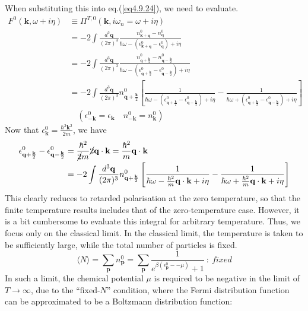  When substituting this into eq.(\ref{eq4.9.24}), we need to evaluate.
\[
\begin{aligned}
F^0(\mathbf k,\omega+i\eta)&\equiv\Pi^{T,0}(\mathbf k,i\omega_n=\omega+i\eta)\\
&=-2\int \frac{d^3\mathbf q}{(2\pi)^3} \frac{n^0_{\mathbf k+\mathbf q}-n^0_{\mathbf q}}{\hbar\omega-(\epsilon^0_{\mathbf k+\mathbf q}-\epsilon^0_{\mathbf q})+i\eta}\\
&=-2\int \frac{d^3\mathbf q}{(2\pi)^3} \frac{n^0_{\mathbf q+\frac{\mathbf k}{2}}-n^0_{\mathbf q-\frac{\mathbf k}{2}}}{\hbar\omega-(\epsilon^0_{\mathbf q+\frac{\mathbf k}{2}}-\epsilon^0_{\mathbf q-\frac{\mathbf k}{2}})+i\eta}\\
&=-2\int \frac{d^3\mathbf q}{(2\pi)^3} n^0_{\mathbf q+\frac{\mathbf k}{2}} \left[ \frac{1}{\hbar \omega-(\epsilon^0_{\mathbf q+\frac{\mathbf k}{2}}-\epsilon^0_{\mathbf q-\frac{\mathbf k}{2}})+i\eta}-\frac{1}{\hbar \omega+(\epsilon^0_{\mathbf q+\frac{\mathbf k}{2}}-\epsilon^0_{\mathbf q-\frac{\mathbf k}{2}})+i\eta} \right]\\
&\quad(\epsilon^0_{-\mathbf k}=\epsilon_{\mathbf k}\quad n^0_{-\mathbf k} =n^0_{\mathbf k}) 
\end{aligned}
\]
Now that $\epsilon_{\mathbf k}^0=\frac{\hbar^2 \mathbf k^2}{2m}$, we have 
\begin{equation}
\begin{aligned}
\epsilon^0_{\mathbf q+\frac{\mathbf k}{2}}-\epsilon^0_{\mathbf q-\frac{\mathbf k}{2}}&=\frac{\hbar^2}{\cancel{2}m}\cancel{2}\mathbf q\cdot \mathbf k=\frac{\hbar^2}{m}\mathbf q\cdot \mathbf k\\
&=-2\int \frac{d^3\mathbf q}{(2\pi)^3} n^0_{\mathbf q+\frac{\mathbf k}{2}} \left[ \frac{1}{\hbar \omega-\frac{\hbar^2}{m} \mathbf q\cdot\mathbf k+i\eta}-\frac{1}{\hbar \omega+\frac{\hbar^2}{m} \mathbf q\cdot\mathbf k+i\eta} \right]
\end{aligned}
\end{equation}
 This clearly reduces to retarded polarisation at the zero temperature, so that the finite temperature results includes that of the zero-temperature case.
 However, it is a bit cumbersome to evaluate this integral for arbitrary temperature.
 Thus, we focus only on the classical limit.
 In the classical limit, the temperature is taken to be sufficiently large, while the total number of particles is fixed.
\[
\langle N\rangle=\sum_{\mathbf p} n^0_{\mathbf p}=\sum_{\mathbf p}\frac{1}{e^{\beta(\epsilon^0_{\mathbf p}--\mu)}+1}\ :\ fixed
\]
 In such a limit, the chemical potential $\mu$ is required to be negative in the limit of $T\to \infty$, due to the ``fixed-$N$'' condition, where the Fermi distribution function can be approximated to be a Boltzmann distribution function:
